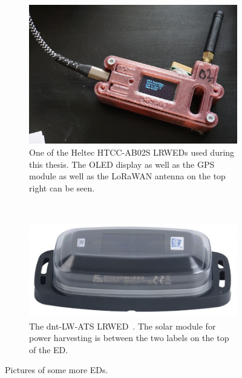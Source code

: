 \begin{figure}
    \centering

    \begin{subfigure}[t]{0.5\textwidth}
        \centering
        \includegraphics[width=1\textwidth]{pictures/hardware/gps-nodes/HTCC-AB02S.jpg}
        \caption[Heltec HTCC-AB02S \aclp{LRWED}]{
            One of the Heltec HTCC-AB02S \aclp{LRWED} used during this thesis.
            The \acs{OLED} display as well as the \ac{GPS} module as well as the \ac{LoRaWAN} antenna on the top right can be seen.
        }\label{pic:heltec-htcc-ab02s}
    \end{subfigure}%
    ~
    \begin{subfigure}[t]{0.5\textwidth}
        \centering
        \includegraphics[width=1\textwidth]{pictures/hardware/gps-nodes/dnt-LW-ATS.jpg}
        \caption[dnt-LW-ATS \acl{LRWED}]{
            The dnt-LW-ATS \acl{LRWED}~\protect\cite{dnt_gmbh_dnt_nodate}.
            The solar module for power harvesting is between the two labels on the top of the \acl{ED}.
        }\label{pic:dnt-lw-ats}
    \end{subfigure}

    \caption{Pictures of some more \aclp{ED}.}
\end{figure}

